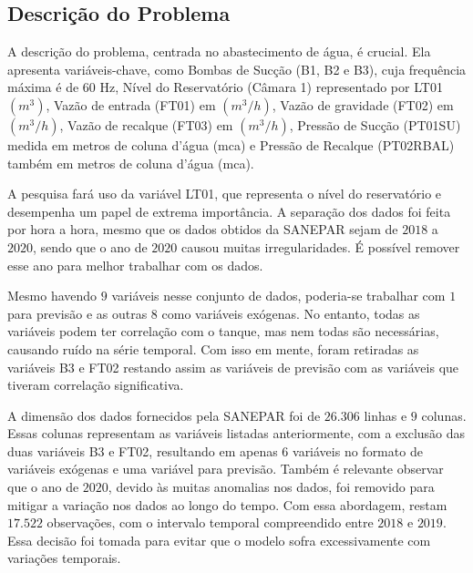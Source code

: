 \subsection{Descri\c c\~ao do Problema} \label{subsec:descricao}
A descrição do problema, centrada no abastecimento de água, é crucial. Ela apresenta variáveis-chave, como Bombas de Sucção (B1, B2 e B3), cuja frequência máxima é de $60$ Hz, Nível do Reservatório (Câmara 1) representado por LT01 $(m^3)$, Vazão de entrada (FT01) em $(m^3/h)$, Vazão de gravidade (FT02) em $(m^3/h)$, Vazão de recalque (FT03) em $(m^3/h)$, Pressão de Sucção (PT01SU) medida em metros de coluna d'água (mca) e Pressão de Recalque (PT02RBAL) também em metros de coluna d'água (mca).

A pesquisa fará uso da variável LT01, que representa o nível do reservatório e desempenha um papel de extrema importância. A separação dos dados foi feita por hora a hora, mesmo que os dados obtidos da SANEPAR sejam de $2018$ a $2020$, sendo que o ano de $2020$ causou muitas irregularidades. É possível remover esse ano para melhor trabalhar com os dados.

Mesmo havendo $9$ variáveis nesse conjunto de dados, poderia-se trabalhar com $1$ para previsão e as outras $8$ como variáveis exógenas. No entanto, todas as variáveis podem ter correlação com o tanque, mas nem todas são necessárias, causando ruído na série temporal. Com isso em mente, foram retiradas as variáveis B3 e FT02 restando assim as variáveis de previsão com as variáveis que tiveram correlação significativa.

A dimensão dos dados fornecidos pela SANEPAR foi de $26.306$ linhas e $9$ colunas. Essas colunas representam as variáveis listadas anteriormente, com a exclusão das duas variáveis B3 e FT02, resultando em apenas $6$ variáveis no formato de variáveis exógenas e uma variável para previsão. Também é relevante observar que o ano de $2020$, devido às muitas anomalias nos dados, foi removido para mitigar a variação nos dados ao longo do tempo. Com essa abordagem, restam $17.522$ observações, com o intervalo temporal compreendido entre $2018$ e $2019$. Essa decisão foi tomada para evitar que o modelo sofra excessivamente com variações temporais.

%
%



